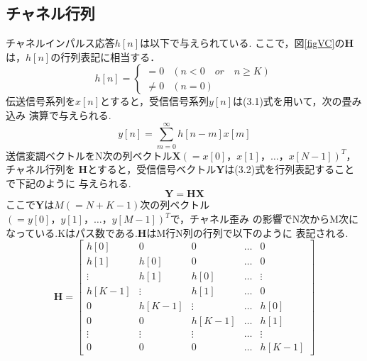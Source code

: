 \subsection{チャネル行列}
チャネルインパルス応答$h[n]$は以下で与えられている.
ここで，図\ref{figVC}の$\bm{H}$は，$h[n]$の行列表記に相当する．
\begin{equation}
    h[n] = \left\{
        \begin{array}{ll}
            = 0 & (n<0 \quad or \quad n \geq K) \\
            \neq 0 & (n=0)
        \end{array}
    \right.
\end{equation}
伝送信号系列を$x[n]$とすると，受信信号系列$y[n]$は(3.1)式を用いて，次の畳み込み
演算で与えられる.
\begin{equation}
    y[n] = \sum_{m=0}^\infty h[n-m]x[m]
\end{equation}
送信変調ベクトルをN次の列ベクトル$\bm{X}(=x[0]，x[1]，\ldots，x[N-1])^T$，チャネル行列を
$\bm{H}$とすると，受信信号ベクトル$\bm{Y}$は(3.2)式を行列表記することで下記のように
与えられる.
\begin{equation}
    \bm{Y} = \bm{HX}
\end{equation}
ここで$\bm{Y}$は$M(=N+K-1)$次の列ベクトル$(=y[0]，y[1]，\ldots，y[M-1])^T$で，チャネル歪み
の影響でN次からM次になっている.Kはパス数である.$\bm{H}$はM行N列の行列で以下のように
表記される.
\begin{equation}
    \bm{H} = \left[
        \begin{array}{ccccc}
            h[0] & 0 & 0 & \ldots & 0 \\
            h[1] & h[0] & 0 & \ldots & 0 \\
            \vdots & h[1] & h[0] & \ldots & \vdots \\
            h[K-1] & \vdots & h[1] & \ldots & 0 \\
            0 & h[K-1] & \vdots & \ldots & h[0] \\
            0 & 0 & h[K-1] & \ldots & h[1] \\
            \vdots & \vdots & \vdots & \ldots & \vdots \\
            0 & 0 & 0 & \ldots & h[K-1]
        \end{array}
    \right]
\end{equation}


